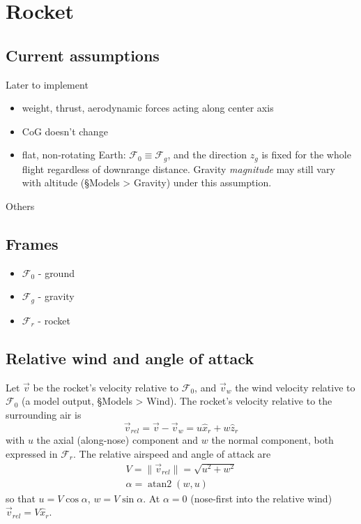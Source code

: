 \documentclass[10pt]{extarticle}
\numberwithin{equation}{subsubsection}
\newcommand{\atantwo}{\operatorname{atan2}}
\begin{document}
\section{Rocket}
\subsection{Current assumptions}
Later to implement
\begin{itemize}
    \item weight, thrust, aerodynamic forces acting along center axis
    \item CoG doesn't change
    \item flat, non-rotating Earth: $\mathcal{F}_0 \equiv \mathcal{F}_g$, and the direction $\hat{z}_g$
    is fixed for the whole flight regardless of downrange distance. Gravity \emph{magnitude} may
    still vary with altitude (\S Models > Gravity) under this assumption.
\end{itemize}
Others
\subsection{Frames}
\begin{itemize}
    \item $\mathcal{F}_0$ - ground
    \item $\mathcal{F}_g$ - gravity
    \item $\mathcal{F}_r$ - rocket
\end{itemize}

\subsection{Relative wind and angle of attack}
Let $\vec{v}$ be the rocket's velocity relative to $\mathcal{F}_0$, and $\vec{v}_w$ the wind
velocity relative to $\mathcal{F}_0$ (a model output, \S Models > Wind). The rocket's velocity
relative to the surrounding air is
\begin{equation}
    \vec{v}_{rel} = \vec{v} - \vec{v}_w = u\hat{x}_r + w\hat{z}_r
\end{equation}
with $u$ the axial (along-nose) component and $w$ the normal component, both expressed in
$\mathcal{F}_r$. The relative airspeed and angle of attack are
\begin{gather}
    V = \|\vec{v}_{rel}\| = \sqrt{u^2 + w^2} \\
    \alpha = \atantwo(w, u)
\end{gather}
so that $u = V\cos\alpha$, $w = V\sin\alpha$. At $\alpha = 0$ (nose-first into the relative wind)
$\vec{v}_{rel} = V\hat{x}_r$.
\end{document}
